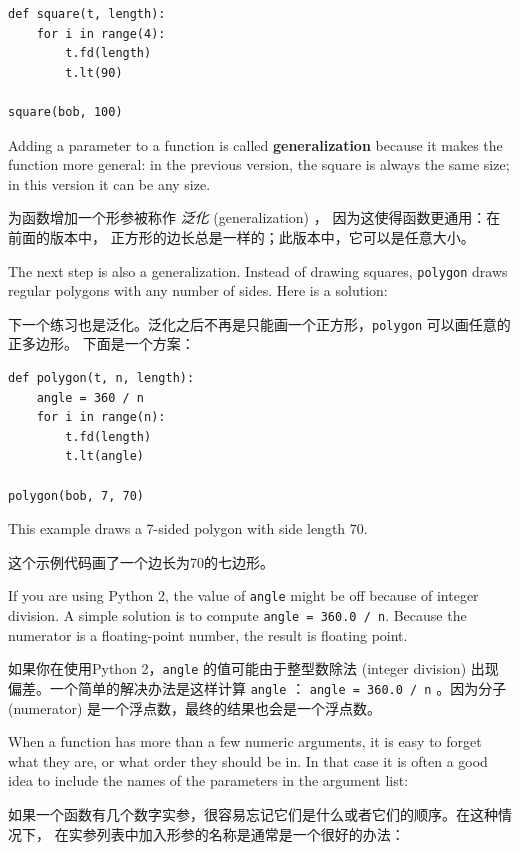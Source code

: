 \begin{lstlisting}
def square(t, length):
    for i in range(4):
        t.fd(length)
        t.lt(90)

square(bob, 100)
\end{lstlisting}

%
Adding a parameter to a function is called {\bf generalization}
because it makes the function more general: in the previous
version, the square is always the same size; in this version
it can be any size.

为函数增加一个形参被称作 \emph{泛化} (generalization) ，
因为这使得函数更通用：在前面的版本中，
正方形的边长总是一样的；此版本中，它可以是任意大小。

The next step is also a generalization.  Instead of drawing
squares, {\tt polygon} draws regular polygons with any number of
sides.  Here is a solution:

下一个练习也是泛化。泛化之后不再是只能画一个正方形，\lstinline{polygon} 可以画任意的正多边形。 下面是一个方案：

\begin{lstlisting}
def polygon(t, n, length):
    angle = 360 / n
    for i in range(n):
        t.fd(length)
        t.lt(angle)

polygon(bob, 7, 70)
\end{lstlisting}


%
This example draws a 7-sided polygon with side length 70.

这个示例代码画了一个边长为70的七边形。

If you are using Python 2, the value of {\tt angle} might be off
because of integer division.  A simple solution is to compute
{\tt angle = 360.0 / n}.  Because the numerator is a floating-point
number, the result is floating point.

如果你在使用Python 2，\lstinline{angle} 的值可能由于整型数除法 (integer division) 出现偏差。一个简单的解决办法是这样计算 \lstinline{angle} ： \lstinline{angle = 360.0 / n} 。因为分子 (numerator) 是一个浮点数，最终的结果也会是一个浮点数。

When a function has more than a few numeric arguments, it is easy to
forget what they are, or what order they should be in.  In that case
it is often a good idea to include the names of the parameters in the
argument list:

如果一个函数有几个数字实参，很容易忘记它们是什么或者它们的顺序。在这种情况下，
在实参列表中加入形参的名称是通常是一个很好的办法：

